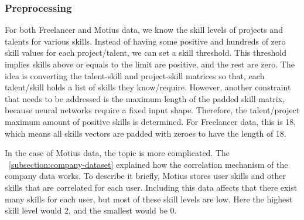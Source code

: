 \subsubsection{Preprocessing}

For both Freelancer and Motius data, we know the skill levels of projects and talents for various skills. Instead of having some positive and hundreds of zero skill values for each project/talent, we can set a skill threshold. This threshold implies skills above or equals to the limit are positive, and the rest are zero. The idea is converting the talent-skill and project-skill matrices so that, each talent/skill holds a list of skills they know/require. However, another constraint that needs to be addressed is the maximum length of the padded skill matrix, because neural networks require a fixed input shape. Therefore, the talent/project maximum amount of positive skills is determined. For Freelancer data, this is 18, which means all skills vectors are padded with zeroes to have the length of 18. 

In the case of Motius data, the topic is more complicated. The ~\autoref{subsection:company-dataset} explained how the correlation mechanism of the company data works. To describe it briefly, Motius stores user skills and other skills that are correlated for each user. Including this data affects that there exist many skills for each user, but most of these skill levels are low. Here the highest skill level would 2, and the smallest would be 0.



